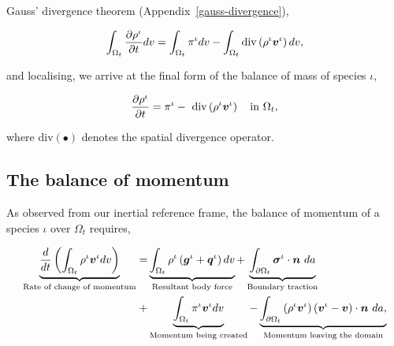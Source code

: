 Gauss' divergence theorem (Appendix~\ref{gauss-divergence}),

\begin{equation*}
\int_{\Omega_{t}} \frac{\partial \rho^{\iota}}{\partial t} dv =
\int_{\Omega_{t}} \pi^{\iota} dv
- \int_{\Omega_{t}} \mathrm{div} \left( \rho^{\iota} \mbox{\boldmath$ v$}^{\iota}\right) dv, 
\end{equation*}

and localising, we arrive at the final form of the balance of
mass of species $\iota$,

\begin{equation}
\frac{\partial \rho^{\iota}}{\partial t}  =
\pi^{\iota}
-\ \mathrm{div} \left(\rho^{\iota} \mbox{\boldmath$ v$}^{\iota}\right)
\quad \mathrm{in}\ \Omega_{t},
\label{localbalanceofmass}
\end{equation}

where $\mathrm{div} (\bullet)$ denotes the spatial divergence
operator. %



\subsection{The balance of momentum}
\label{eu-balance-of-momentum}

As observed from our inertial reference frame, the balance of
momentum of a species $\iota$ over $\Omega_{t}$ requires,

\begin{equation}
\begin{split}
\underbrace{\frac{d}{dt}\left(\int_{\Omega_{t}} \rho^{\iota}
  \mbox{\boldmath$ v$}^{\iota} dv \right)}_{\text{Rate of change of momentum}}  = 
& \underbrace{\int_{\Omega_{t}} \rho^{\iota} \left(\mbox{\boldmath$ g$}^{\iota} +
  \mbox{\boldmath$ q$}^{\iota}\right) dv}_{\text{Resultant body force}} 
+ \underbrace{\int_{\partial \Omega_{t}}
  \mbox{\boldmath$\sigma$}^{\iota}\cdot\mbox{\boldmath$ n$}\ da}_{\text{Boundary traction}}\\ 
+ & \underbrace{\int_{\Omega_{t}} \pi^{\iota}\mbox{\boldmath$ v$}^{\iota}
  dv}_{\text{Momentum being created}}
- \underbrace{\int_{\partial \Omega_{t}} \left(\rho^{\iota}
  \mbox{\boldmath$ v$}^{\iota} \right) \left(\mbox{\boldmath$ v$}^{\iota} -
\mbox{\boldmath$ v$}\right) \cdot \mbox{\boldmath$ n$}\ da,}_{\text{Momentum leaving the domain}} 
\end{split}
\label{globalbalanceofmomentum}
\end{equation}

